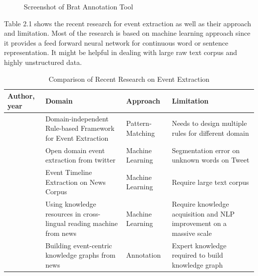 \documentclass[twoside]{utmthesis}
\begin{document}
\begin{figure}[H]
	\centering
	\caption{Screenshot of Brat Annotation Tool}
	\label{fig:bratannotation}
\end{figure}
\vspace{-1.5cm}
 
Table 2.1 shows the recent research for event extraction as well as their approach and limitation. Most of the research is based on machine learning approach since it provides a feed forward neural network for continuous word or sentence representation. It might be helpful in dealing with large raw text corpus and highly unstructured data. 
 
\begin{table}[H]
\fontsize{11}{12}\selectfont
\caption{Comparison of Recent Research on Event Extraction}
\renewcommand{\arraystretch}{1}
\begin{tabular}{|p{2cm} |p{4cm} |p{2cm}|p{5cm}|}
	\hline 
	Author, year & Domain & Approach & Limitation \\ 
	\hline 
	\citep{valenzuela2015domain}&Domain-independent Rule-based Framework for Event Extraction  & Pattern-Matching & Needs to design multiple rules for different domain  \\ 
	\hline 
	\citep{ritter2012open}&Open domain event extraction from twitter  & Machine Learning & Segmentation error on unknown words on Tweet  \\ 
	\hline
	\citep{wu2017event}&Event Timeline Extraction on News Corpus & Machine Learning  & Require large text corpus \\ 
	\hline 
	\citep{vossen2016newsreader}&Using knowledge resources in cross-lingual reading machine from news  & Machine Learning & Require knowledge acquisition and NLP improvement on a massive scale \\ 
	\hline 
	\citep{rospocher2016building}& Building event-centric knowledge graphs from news & Annotation & Expert knowledge required to build knowledge graph \\ 
	\hline 
	
\end{tabular} 
\end{table}
\vspace{-1cm}
\end{document}
